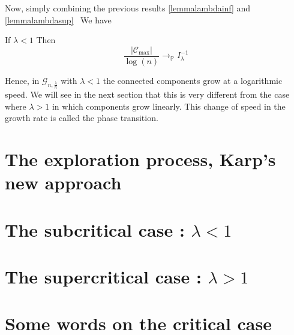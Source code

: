 Now, simply combining the previous results \ref{lemmalambdainf} and \ref{lemmalambdasup}  We have
\begin{theorem}
	If $\lambda < 1$
	\newline
	Then
	\begin{equation}
		\frac{|\mathcal{C}_{\max}|}{\log(n)} \longrightarrow_\mathbb{P} I_{\lambda}^{-1}
	\end{equation}
\end{theorem}
Hence, in $\mathcal{G}_{n, \frac{\lambda}{n}}$ with $\lambda < 1$ the connected components grow at a logarithmic speed. We will see in the next section that this is very different from the case where $\lambda > 1$ in which components grow linearly.
This change of speed in the growth rate is called the phase transition.

\section{The exploration process, Karp's new approach}
\section{The subcritical case : $\lambda < 1 $ }
\section{The supercritical case : $\lambda > 1 $ }
\section{Some words on the critical case}
